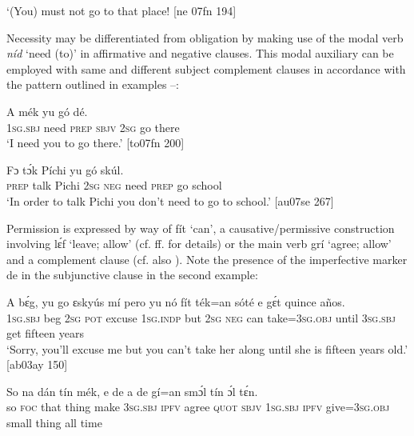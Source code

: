 \glt ‘(You) must not go to that place! [ne 07fn 194]
\z

Necessity may be differentiated from obligation by making use of the modal verb \textit{níd} ‘need (to)’ in affirmative  and negative  clauses. This modal auxiliary can be employed with same and different subject complement clauses in accordance with the pattern outlined in examples –: 


\ea%
    \label{ex:key:424}
    \gll \MakeUppercase{A}        mék    yu  gó  dé.\\
\textsc{1sg.sbj}  need  \textsc{prep}  \textsc{sbjv}    \textsc{2sg}  go  there\\

\glt ‘I need you to go there.’ [to07fn 200]
\z


\ea%
    \label{ex:key:425}
    \gll Fɔ  tɔ́k  Píchi  yu        gó  skúl.\\
\textsc{prep}  talk  Pichi  \textsc{2sg}  \textsc{neg}  need  \textsc{prep}  go  school\\

\glt ‘In order to talk Pichi you don’t need to go to school.’ [au07se 267]
\z

Permission is expressed by way of fít ‘can’, a causative/permissive construction involving lɛ́f ‘leave; allow’ (cf. ff. for details) or the main verb grí ‘agree; allow’ and a complement clause {\fff} (cf. also ). Note the presence of the imperfective marker de in the subjunctive clause in the second example: {\fff}


\ea%
    \label{ex:key:426}
    \gll A    bɛ́g,    yu  go  ɛskyús  mí    pero  yu  nó  fít
ték=an    sóté    e    gɛ́t  quince  años.\\
\textsc{1sg.sbj}  beg    \textsc{2sg}  \textsc{pot}  excuse  \textsc{1sg.indp}  but    \textsc{2sg}  \textsc{neg}  can
take=\textsc{3sg.obj}  until  \textsc{3sg.sbj}  get  fifteen  years\\

\glt ‘Sorry, you’ll excuse me but you can’t take her along until she is fifteen
years old.’ [ab03ay 150]
\z


\ea%
    \label{ex:key:427}
    \gll So  na  dán  tín    mék,  e    de            
a    de  gí=an    smɔ́l  tín    ɔ́l  tɛ́n.\\
so  \textsc{foc}  that  thing  make  \textsc{3sg.sbj}  \textsc{ipfv}  agree  \textsc{quot}    \textsc{sbjv}  
\textsc{1sg.sbj}  \textsc{ipfv}  give\textsc{=3sg.obj}  small  thing  all  time\\

